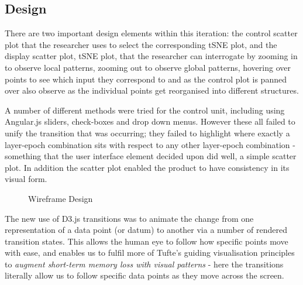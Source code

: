 \documentclass[a4paper,11pt,titlepage]{article}
\begin{document}
	\subsection{Design}	
	There are two important design elements within this iteration: the control scatter plot that the researcher uses to select the corresponding tSNE plot, and the display scatter plot, tSNE plot, that the researcher can interrogate by zooming in to observe local patterns, zooming out to observe global patterns, hovering over points to see which input they correspond to and as the control plot is panned over also observe as the individual points get reorganised into different structures.
	\par 
	A number of different methods were tried for the control unit, including using Angular.js sliders, check-boxes and drop down menus. However these all failed to unify the transition that was occurring; they failed to highlight where exactly a layer-epoch combination sits with respect to any other layer-epoch combination - something that the user interface element decided upon did well, a simple scatter plot. In addition the scatter plot enabled the product to have consistency in its visual form.

	\begin{figure}[H]
    			\caption{Wireframe Design}%
	\end{figure}	
	 
	The new use of D3.js transitions was to animate the change from one representation of a data point (or datum) to another via a number of rendered transition states. This allows the human eye to follow how specific points move with ease, and enables us to fulfil more of Tufte's guiding visualisation principles to \textit{augment short-term memory loss with visual patterns} - here the transitions literally allow us to follow specific data points as they move across the screen.
	\par 
	
\end{document}
